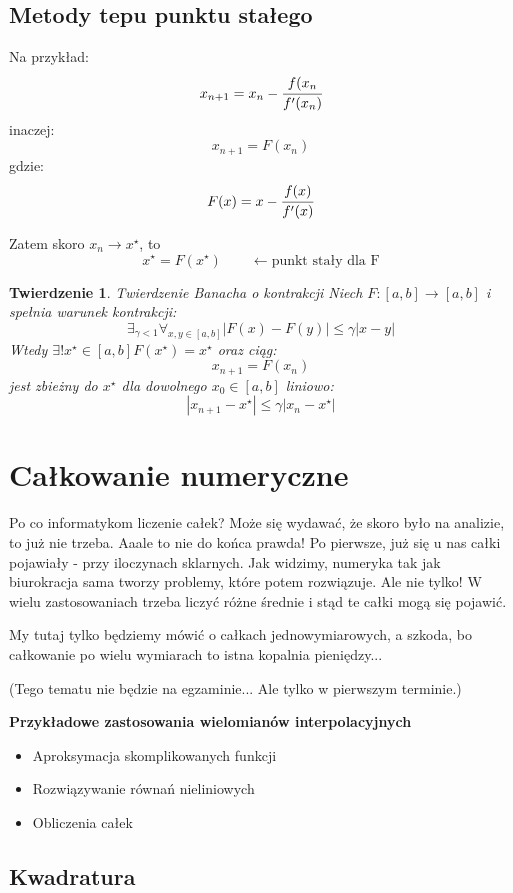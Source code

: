 \documentclass[hidelinks,a4paper,fleqn,oneside]{book}
\newcommand{\ra}{\rightarrow}
\newcommand{\la}{\leftarrow}
\newtheorem{twierdz}{Twierdzenie}
\begin{document}
\subsection{Metody tepu punktu stałego}

Na przykład:
\[
	x_{n+1} = x_n - \cfrac{f(x_n}{f'(x_n)}
\]
inaczej:
\[
	x_{n+1} = F(x_n)
\]
gdzie:
\[
	F(x) = x - \cfrac{f(x)}{f'(x)}
\]

Zatem skoro $x_n \longrightarrow x^\star$, to
\[
	x^\star = F(x^\star)\quad \quad \la \textrm{punkt stały dla F}
\]
\begin{twierdz}{Twierdzenie Banacha o kontrakcji}
	Niech $F: [a, b] \ra [a, b]$ i spełnia warunek kontrakcji:
	\[
		\exists_{\gamma < 1} \forall_{x, y \in [a, b]} |F(x) - F(y)| \leq \gamma |x-y|
	\]
	Wtedy $\exists! x^\star \in [a, b] F(x^\star) = x^\star$
	oraz ciąg:
	\[
		x_{n+1} = F(x_n)
	\]
	jest zbieżny do $x^\star$ dla dowolnego $x_0 \in [a, b]$ liniowo:
	\[
		|x_{n+1} - x^\star| \leq \gamma|x_n - x^\star|
	\]
\end{twierdz}

\section{Całkowanie numeryczne}

Po co informatykom liczenie całek? Może się wydawać, że skoro było na analizie, to już nie trzeba. Aaale to nie do końca prawda! Po pierwsze, już się u nas całki pojawiały - przy iloczynach sklarnych. Jak widzimy, numeryka tak jak biurokracja sama tworzy problemy, które potem rozwiązuje. Ale nie tylko! W wielu zastosowaniach trzeba liczyć różne średnie i stąd te całki mogą się pojawić. 

My tutaj tylko będziemy mówić o całkach jednowymiarowych, a szkoda, bo całkowanie po wielu wymiarach to istna kopalnia pieniędzy...

(Tego tematu nie będzie na egzaminie... Ale tylko w pierwszym terminie.)

\textbf{Przykładowe zastosowania wielomianów interpolacyjnych}
\begin{itemize}
	\item Aproksymacja skomplikowanych funkcji
	\item Rozwiązywanie równań nieliniowych
	\item Obliczenia całek
\end{itemize}

\subsection*{Kwadratura}
\end{document}
